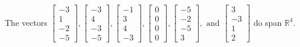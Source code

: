 \begin{exercise}
\begin{exerciseStatement}
  \end{exerciseStatement}
  \begin{exerciseAnswer}
   The vectors \(\left[\begin{array}{r}
-3 \\
1 \\
-2 \\
-5
\end{array}\right] , \left[\begin{array}{r}
-3 \\
4 \\
-3 \\
-5
\end{array}\right] , \left[\begin{array}{r}
-1 \\
3 \\
4 \\
-3
\end{array}\right] , \left[\begin{array}{r}
0 \\
0 \\
0 \\
0
\end{array}\right] , \left[\begin{array}{r}
-5 \\
-2 \\
-5 \\
3
\end{array}\right] , \text{ and } \left[\begin{array}{r}
3 \\
-3 \\
1 \\
2
\end{array}\right]\) 
  	 do  
	span \(\mathbb{R}^4\).
  


  \end{exerciseAnswer}
\end{exercise}